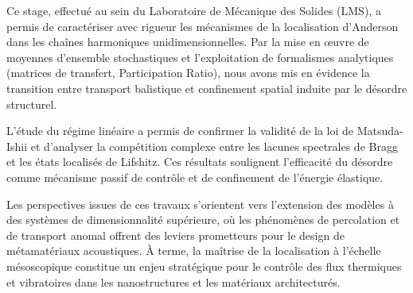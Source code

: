 Ce stage, effectué au sein du Laboratoire de Mécanique des Solides (LMS), a permis de caractériser avec rigueur les mécanismes de la localisation d'Anderson dans les chaînes harmoniques unidimensionnelles. Par la mise en œuvre de moyennes d'ensemble stochastiques et l'exploitation de formalismes analytiques (matrices de transfert, Participation Ratio), nous avons mis en évidence la transition entre transport balistique et confinement spatial induite par le désordre structurel.

L'étude du régime linéaire a permis de confirmer la validité de la loi de Matsuda-Ishii et d'analyser la compétition complexe entre les lacunes spectrales de Bragg et les états localisés de Lifshitz. Ces résultats soulignent l'efficacité du désordre comme mécanisme passif de contrôle et de confinement de l'énergie élastique.

Les perspectives issues de ces travaux s'orientent vers l'extension des modèles à des systèmes de dimensionnalité supérieure, où les phénomènes de percolation et de transport anomal offrent des leviers prometteurs pour le design de métamatériaux acoustiques. À terme, la maîtrise de la localisation à l'échelle mésoscopique constitue un enjeu stratégique pour le contrôle des flux thermiques et vibratoires dans les nanostructures et les matériaux architecturés.

